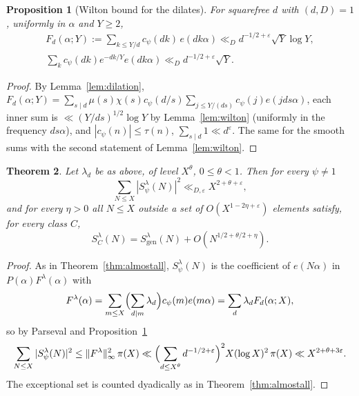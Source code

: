 ﻿\documentclass[11pt]{amsart}
\newtheorem{theorem}{Theorem}[section]
\newtheorem{proposition}[theorem]{Proposition}
\theoremstyle{remark}
\newcommand{\gen}{\mathrm{gen}}
\newcommand{\e}{\varepsilon}
\begin{document}
\begin{proposition}[Wilton bound for the dilates]\label{prop:wiltond}
For squarefree $d$ with $(d,D)=1$, uniformly in $\alpha$ and $Y\ge2$,
\begin{gather*}
F_d(\alpha;Y):=\sum_{k\le Y/d}c_\psi(dk)\,e(dk\alpha)\ll_D d^{-1/2+\e}\sqrt Y\log Y,\\
\sum_{k}c_\psi(dk)e^{-dk/Y}e(dk\alpha)\ll_Dd^{-1/2+\e}\sqrt Y .
\end{gather*}
\end{proposition}
\begin{proof}
By Lemma~\ref{lem:dilation}, $F_d(\alpha;Y)=\sum_{s\mid d}\mu(s)\chi(s)c_\psi(d/s)\sum_{j\le Y/(ds)}c_\psi(j)e(jds\alpha)$, each inner sum is $\ll(Y/ds)^{1/2}\log Y$ by Lemma~\ref{lem:wilton} (uniformly in the frequency $ds\alpha$), and $|c_\psi(n)|\le\tau(n)$, $\sum_{s\mid d}1\ll d^\e$. The same for the smooth sums with the second statement of Lemma~\ref{lem:wilton}.
\end{proof}

\begin{theorem}\label{thm:sifted}
Let $\lambda_d$ be as above, of level $X^\theta$, $0\le\theta<1$. Then for every $\psi\ne1$
\[
\sum_{N\le X}|S^\lambda_\psi(N)|^2\ll_{D,\e}X^{2+\theta+\e},
\]
and for every $\eta>0$ all $N\le X$ outside a set of $O(X^{1-2\eta+\e})$ elements satisfy, for every class $C$,
\[
S^\lambda_C(N)=S^\lambda_\gen(N)+O(N^{1/2+\theta/2+\eta}).
\]
\end{theorem}
\begin{proof}
As in Theorem~\ref{thm:almostall}, $S^\lambda_\psi(N)$ is the coefficient of $e(N\alpha)$ in $P(\alpha)F^\lambda(\alpha)$ with
\[
F^\lambda(\alpha)=\sum_{m\le X}\Bigl(\sum_{d\mid m}\lambda_d\Bigr)c_\psi(m)e(m\alpha)=\sum_d\lambda_dF_d(\alpha;X),
\]
so by Parseval and Proposition~\ref{prop:wiltond}
\[
\sum_{N\le X}|S^\lambda_\psi(N)|^2\le\|F^\lambda\|_\infty^2\,\pi(X)\ll\Bigl(\sum_{d\le X^\theta}d^{-1/2+\e}\Bigr)^2X(\log X)^2\,\pi(X)\ll X^{2+\theta+3\e}.
\]
The exceptional set is counted dyadically as in Theorem~\ref{thm:almostall}.
\end{proof}
\end{document}
